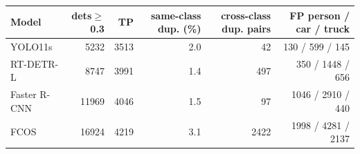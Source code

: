 \begin{tabular}{lrrrrr}
\toprule
Model & dets$\geq$0.3 & TP & same-class dup. (\%) & cross-class dup. pairs & FP person / car / truck \\
\midrule
YOLO11s & 5232 & 3513 & 2.0 & 42 & 130 / 599 / 145 \\
RT-DETR-L & 8747 & 3991 & 1.4 & 497 & 350 / 1448 / 656 \\
Faster R-CNN & 11969 & 4046 & 1.5 & 97 & 1046 / 2910 / 440 \\
FCOS & 16924 & 4219 & 3.1 & 2422 & 1998 / 4281 / 2137 \\
\bottomrule
\end{tabular}
